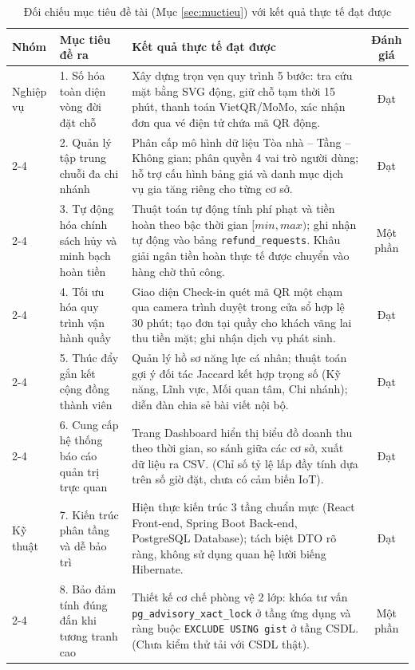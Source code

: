 \begin{table}[H]
\centering
\caption{Đối chiếu mục tiêu đề tài (Mục \ref{sec:muctieu}) với kết quả thực tế đạt được}
\label{tab:kl_muctieu}
\small
\renewcommand{\arraystretch}{1.22}
\begin{tabular}{|p{1.4cm}|p{4.2cm}|p{6.4cm}|c|}
\hline
\textbf{Nhóm} & \textbf{Mục tiêu đề ra} & \textbf{Kết quả thực tế đạt được} & \textbf{Đánh giá} \\
\hline
Nghiệp vụ & 1. Số hóa toàn diện vòng đời đặt chỗ & Xây dựng trọn vẹn quy trình 5 bước: tra cứu mặt bằng SVG động, giữ chỗ tạm thời 15 phút, thanh toán VietQR/MoMo, xác nhận đơn qua vé điện tử chứa mã QR động. & Đạt \\
\cline{2-4}
 & 2. Quản lý tập trung chuỗi đa chi nhánh & Phân cấp mô hình dữ liệu Tòa nhà -- Tầng -- Không gian; phân quyền 4 vai trò người dùng; hỗ trợ cấu hình bảng giá và danh mục dịch vụ gia tăng riêng cho từng cơ sở. & Đạt \\
\cline{2-4}
 & 3. Tự động hóa chính sách hủy và minh bạch hoàn tiền & Thuật toán tự động tính phí phạt và tiền hoàn theo bậc thời gian $[min, max)$; ghi nhận tự động vào bảng \texttt{refund\_requests}. Khâu giải ngân tiền hoàn thực tế được chuyển vào hàng chờ thủ công. & Một phần \\
\cline{2-4}
 & 4. Tối ưu hóa quy trình vận hành quầy & Giao diện Check-in quét mã QR một chạm qua camera trình duyệt trong cửa sổ hợp lệ 30 phút; tạo đơn tại quầy cho khách vãng lai thu tiền mặt; ghi nhận dịch vụ phát sinh. & Đạt \\
\cline{2-4}
 & 5. Thúc đẩy gắn kết cộng đồng thành viên & Quản lý hồ sơ năng lực cá nhân; thuật toán gợi ý đối tác Jaccard kết hợp trọng số (Kỹ năng, Lĩnh vực, Mối quan tâm, Chi nhánh); diễn đàn chia sẻ bài viết nội bộ. & Đạt \\
\cline{2-4}
 & 6. Cung cấp hệ thống báo cáo quản trị trực quan & Trang Dashboard hiển thị biểu đồ doanh thu theo thời gian, so sánh giữa các cơ sở, xuất dữ liệu ra CSV. (Chỉ số tỷ lệ lấp đầy tính dựa trên số giờ đặt, chưa có cảm biến IoT). & Đạt \\
\hline
Kỹ thuật & 7. Kiến trúc phân tầng và dễ bảo trì & Hiện thực kiến trúc 3 tầng chuẩn mực (React Front-end, Spring Boot Back-end, PostgreSQL Database); tách biệt DTO rõ ràng, không sử dụng quan hệ lười biếng Hibernate. & Đạt \\
\cline{2-4}
 & 8. Bảo đảm tính đúng đắn khi tương tranh cao & Thiết kế cơ chế phòng vệ 2 lớp: khóa tư vấn \texttt{pg\_advisory\_xact\_lock} ở tầng ứng dụng và ràng buộc \texttt{EXCLUDE USING gist} ở tầng CSDL. (Chưa kiểm thử tải với CSDL thật). & Một phần \\

\end{tabular}
\end{table}
